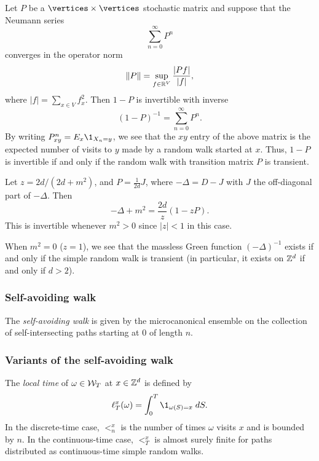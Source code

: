 \begin{example}
Let $P$ be a $\vertices \times \vertices$ stochastic matrix and suppose that the Neumann series
\begin{equation}
\sum_{n=0}^\infty P^n
\end{equation}
converges in the operator norm
\begin{equation}
\|P\| = \sup_{f \in {\mathbb R}^V} \frac{|P f|}{|f|},
\end{equation}
where $|f| = \sum_{x\in V} f_x^2$. Then $1 - P$ is invertible with inverse
\begin{equation}
(1 - P)^{-1} = \sum_{n=0}^\infty P^n.
\end{equation}
By writing $P^n_{xy} = E_x \1_{X_n=y}$, we see that the $xy$ entry of the
above matrix is the expected number of visits to $y$ made by a random walk
started at $x$. Thus, $1 - P$ is invertible if and only if the random walk
with transition matrix $P$ is transient. 

Let $z = 2 d / (2 d + m^2)$, and $P = \frac{1}{2 d} J$,
where $-\Delta = D - J$ with $J$ the off-diagonal part of $-\Delta$. Then
\begin{equation}
-\Delta + m^2 = \frac{2 d}{z} (1 - z P).
\end{equation}
This is invertible whenever $m^2 > 0$ since $|z| < 1$ in this case.

When $m^2 = 0$ ($z = 1$), we see that the massless Green function $(-\Delta)^{-1}$
exists if and only if the simple random walk is transient (in particular, it exists on
${ {{\mathbb Z}}^d }$ if and only if $d > 2$).
\end{example}

\subsubsection{Self-avoiding walk}

The \emph{self-avoiding walk} is given by the microcanonical ensemble on the
collection of self-intersecting paths starting at $0$ of length $n$.

\subsubsection{Variants of the self-avoiding walk}

The \emph{local time} of $\omega \in \mathcal{W}_T$ at $x \in { {{\mathbb Z}}^d }$ is defined by
\begin{equation}
\lt^x_T(\omega) = \int_0^T \1_{\omega(S)=x} \; dS.
\end{equation}
In the discrete-time case, $\lt^x_n$ is the number of times $\omega$ visits $x$
and is bounded by $n$. In the continuous-time case, $\lt^x_T$ is almost surely
finite for paths distributed as continuous-time simple random walks.

